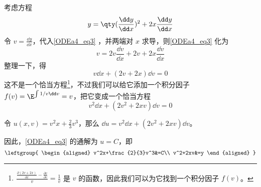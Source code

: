 \begin{example}{}\label{ODEa4_ex2}


考虑方程
\begin{equation}\label{ODEa4_eq3}
y=\qty(\frac{\dd y}{\dd x})^2+2x\frac{\dd y}{\dd x}
\end{equation}
令 $v=\frac{\dd y}{\dd x}$，代入\autoref{ODEa4_eq3} ，并两端对 $x$ 求导，则\autoref{ODEa4_eq3} 化为
\begin{equation}
v=2v\frac{\dd v}{\dd x}+2v+2x\frac{\dd v}{\dd x}
\end{equation}
整理一下，得
\begin{equation}
v\dd x+(2v+2x)\dd v=0
\end{equation}
这不是一个恰当方程\footnote{$\frac{\frac{\partial (2v+2x)}{\partial x}-\frac{\partial v}{\partial v}}{v}=\frac{1}{v}$ 是 $v$ 的函数，因此我们可以为它找到一个积分因子 $f(v)$。}，不过我们可以给它添加一个积分因子 $f(v)=\E^{\int 1/v \dd v}=v$，把它变成一个恰当方程
\begin{equation}
v^2\dd x+(2v^2+2xv)\dd v=0
\end{equation}

令 $u(x, v)=v^2x+\frac{2}{3}v^3$，那么 $\dd u=v^2\dd x+(2v^2+2xv)\dd v$。

因此，\autoref{ODEa4_eq3} 的通解为 $u=C$，即
\begin{equation}
\leftgroup{
    \begin{aligned}
    v^2x+\frac{2}{3}v^3&=C\\
    v^2+2xv&=y
    \end{aligned}
}
\end{equation}



\end{example}


